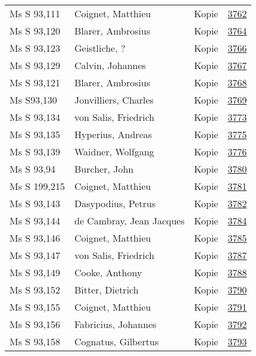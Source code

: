 \documentclass[10pt,a4paper,landscape]{report}
\begin{document}
\begin{longtable}{p{16cm}p{4cm}lr}
Ms S 93,111	&	Coignet, Matthieu	&	Kopie	&	\href{http://130.60.24.72/assignment/3762}{3762}\\
Ms S 93,120	&	Blarer, Ambrosius	&	Kopie	&	\href{http://130.60.24.72/assignment/3764}{3764}\\
Ms S 93,123	&	Geistliche, ?	&	Kopie	&	\href{http://130.60.24.72/assignment/3766}{3766}\\
Ms S 93,129	&	Calvin, Johannes	&	Kopie	&	\href{http://130.60.24.72/assignment/3767}{3767}\\
Ms S 93,121	&	Blarer, Ambrosius	&	Kopie	&	\href{http://130.60.24.72/assignment/3768}{3768}\\
Ms S93,130	&	Jonvilliers, Charles	&	Kopie	&	\href{http://130.60.24.72/assignment/3769}{3769}\\
Ms S 93,134	&	von Salis, Friedrich	&	Kopie	&	\href{http://130.60.24.72/assignment/3773}{3773}\\
Ms S 93,135	&	Hyperius, Andreas	&	Kopie	&	\href{http://130.60.24.72/assignment/3775}{3775}\\
Ms S 93,139	&	Waidner, Wolfgang	&	Kopie	&	\href{http://130.60.24.72/assignment/3776}{3776}\\
Ms S 93,94	&	Burcher, John	&	Kopie	&	\href{http://130.60.24.72/assignment/3780}{3780}\\
Ms S 199,215	&	Coignet, Matthieu	&	Kopie	&	\href{http://130.60.24.72/assignment/3781}{3781}\\
Ms S 93,143	&	Dasypodius, Petrus	&	Kopie	&	\href{http://130.60.24.72/assignment/3782}{3782}\\
Ms S 93,144	&	de Cambray, Jean Jacques	&	Kopie	&	\href{http://130.60.24.72/assignment/3784}{3784}\\
Ms S 93,146	&	Coignet, Matthieu	&	Kopie	&	\href{http://130.60.24.72/assignment/3785}{3785}\\
Ms S 93,147	&	von Salis, Friedrich	&	Kopie	&	\href{http://130.60.24.72/assignment/3787}{3787}\\
Ms S 93,149	&	Cooke, Anthony	&	Kopie	&	\href{http://130.60.24.72/assignment/3788}{3788}\\
Ms S 93,152	&	Bitter, Dietrich	&	Kopie	&	\href{http://130.60.24.72/assignment/3790}{3790}\\
Ms S 93,155	&	Coignet, Matthieu	&	Kopie	&	\href{http://130.60.24.72/assignment/3791}{3791}\\
Ms S 93,156	&	Fabricius, Johannes	&	Kopie	&	\href{http://130.60.24.72/assignment/3792}{3792}\\
Ms S 93,158	&	Cognatus, Gilbertus	&	Kopie	&	\href{http://130.60.24.72/assignment/3793}{3793}\\

\end{longtable}
\end{document}
